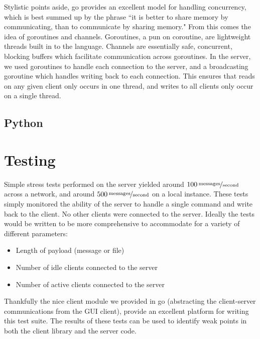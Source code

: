 \documentclass[12pt, letterpaper]{article}
\begin{document}
Stylistic points aside, go provides an excellent model for handling 
concurrency, which is best summed up by the phrase ``it is better to 
share memory by communicating, than to communicate by sharing memory." 
From this comes the idea of goroutines and channels. Goroutines, a pun 
on coroutine, are lightweight threads built in to the language. 
Channels are essentially safe, concurrent, blocking buffers which 
facilitate communication across goroutines. In the server, we used 
goroutines to handle each connection to the server, and a broadcasting
goroutine which handles writing back to each connection. This ensures
that reads on any given client only occurs in one thread, and writes to
all clients only occur on a single thread.


\subsection*{Python}



\section*{Testing}

Simple stress tests performed on the server yielded around
$\unitfrac[100]{messages}{second}$ 
across a network, and around
$\unitfrac[500]{messages}{second}$
on a 
local instance. These tests simply monitored the ability of the server 
to handle a single command and write back to the client. No other 
clients were connected to the server. Ideally the tests would be 
written to be more comprehensive to accommodate for a variety of 
different parameters:

\begin{itemize}
	\item Length of payload (message or file)
	\item Number of idle clients connected to the server
	\item Number of active clients connected to the server
\end{itemize}

Thankfully the nice client module we provided in go (abstracting the 
client-server communications from the GUI client), provide an excellent 
platform for writing this test suite. The results of these tests can be 
used to identify weak points in both the client library and the server 
code.
\end{document}
